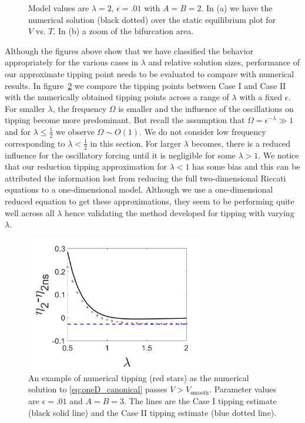 \begin{figure}[H]
\begin{subfigure}{.5\textwidth}
  \caption{}
\end{subfigure}
\caption{Model values are $\lambda=2$, $\epsilon=.01$ with $A=B=2$. In (a) we have the numerical solution (black dotted) over the static equilibrium plot for $V$ vs. $T$. In (b) a zoom of the bifurcation area.}
\label{fig:twoD_slowosc_Tnumerics_large}
\end{figure}

Although the figures above show that we have classified the behavior appropriately for the various cases in $\lambda$ and relative solution sizes, performance of our approximate tipping point needs to be evaluated to compare with numerical results. In figure~\ref{fig:twoD_slowosc_lambdacomp} we compare the tipping points between Case I and Case II with the numerically obtained tipping points across a range of $\lambda$ with a fixed $\epsilon$. For smaller $\lambda$, the frequency $\Omega$ is smaller and the influence of the oscillations on tipping become more predominant. But recall the assumption that $\Omega=\epsilon^{-\lambda}\gg 1$ and for $\lambda\le\frac{1}{2}$ we observe $\Omega\sim O(1)$. We do not consider low frequency corresponding to $\lambda<\frac{1}{2}$ in this section. For larger $\lambda$ becomes, there is a reduced influence for the oscillatory forcing until it is negligible for some $\lambda>1$. We notice that our reduction tipping approximation for $\lambda<1$ has some bias and this can be attributed the information lost from reducing the full two-dimensional Riccati equations to a one-dimensional model. Although we use a one-dimensional reduced equation to get these approximations, they seem to be performing quite well across all $\lambda$ hence validating the method developed for tipping with varying $\lambda$.

\begin{figure}[H]
\centering
\includegraphics[width=0.7\textwidth]{twoD/slowosc_lambdacomp.jpg}
\caption{An example of numerical tipping (red stars) as the numerical solution to \eqref{eq:oneD_canonical} passes $V>V_{\text{smooth}}$. Parameter values are $\epsilon=.01$ and $A=B=3$. The lines are the Case I tipping estimate (black solid line) and the Case II tipping estimate (blue dotted line).}
\label{fig:twoD_slowosc_lambdacomp}
\end{figure} 

